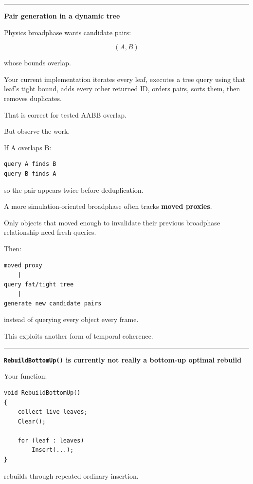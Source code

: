 \begin{center}\rule{0.5\linewidth}{0.5pt}\end{center}

\textbf{Pair generation in a dynamic tree}

Physics broadphase wants candidate pairs:

\[
(A,B)
\]

whose bounds overlap.

Your current implementation iterates every leaf, executes a tree query using that leaf's tight bound, adds every other returned ID, orders pairs, sorts them, then removes duplicates.

That is correct for tested AABB overlap.

But observe the work.

If A overlaps B:

\begin{verbatim}
query A finds B
query B finds A
\end{verbatim}

so the pair appears twice before deduplication.

A more simulation-oriented broadphase often tracks \textbf{moved proxies}.

Only objects that moved enough to invalidate their previous broadphase relationship need fresh queries.

Then:

\begin{verbatim}
moved proxy
    |
query fat/tight tree
    |
generate new candidate pairs
\end{verbatim}

instead of querying every object every frame.

This exploits another form of temporal coherence.

\begin{center}\rule{0.5\linewidth}{0.5pt}\end{center}

\textbf{\texttt{RebuildBottomUp()} is currently not really a bottom-up optimal rebuild}

Your function:

\begin{verbatim}
void RebuildBottomUp()
{
    collect live leaves;
    Clear();

    for (leaf : leaves)
        Insert(...);
}
\end{verbatim}

rebuilds through repeated ordinary insertion.

